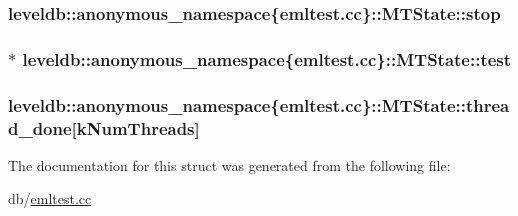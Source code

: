 \subsubsection[{stop}]{ leveldb\+::anonymous\+\_\+namespace\{emltest.\+cc\}\+::M\+T\+State\+::stop}\label{structleveldb_1_1anonymous__namespace_02emltest_8cc_03_1_1_m_t_state_a44404b008dabef302d27f05a438a39c5}
\hypertarget{structleveldb_1_1anonymous__namespace_02emltest_8cc_03_1_1_m_t_state_a636a8dabfcb131bc2b3a49f7438118a7}{}
\subsubsection[{test}]{$\ast$ leveldb\+::anonymous\+\_\+namespace\{emltest.\+cc\}\+::M\+T\+State\+::test}\label{structleveldb_1_1anonymous__namespace_02emltest_8cc_03_1_1_m_t_state_a636a8dabfcb131bc2b3a49f7438118a7}
\hypertarget{structleveldb_1_1anonymous__namespace_02emltest_8cc_03_1_1_m_t_state_aed319e3fbe8770f3bcdf86c03cfda1b3}{}
\subsubsection[{thread\+\_\+done}]{ leveldb\+::anonymous\+\_\+namespace\{emltest.\+cc\}\+::M\+T\+State\+::thread\+\_\+done\mbox{[}{\bf k\+Num\+Threads}\mbox{]}}\label{structleveldb_1_1anonymous__namespace_02emltest_8cc_03_1_1_m_t_state_aed319e3fbe8770f3bcdf86c03cfda1b3}


The documentation for this struct was generated from the following file\+:\begin{DoxyCompactItemize}
\item 
db/\hyperlink{emltest_8cc}{emltest.\+cc}\end{DoxyCompactItemize}
